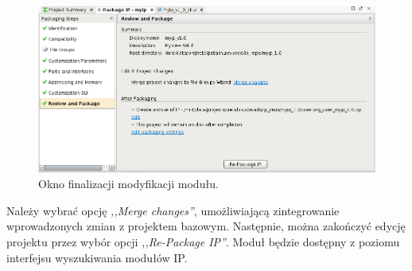 \begin{figure}[ht]
	\centering
	\includegraphics[width=12cm]{img/vivado/axi-dma-review-package.png}
	\caption{Okno finalizacji modyfikacji modułu.}
	\label{fig:axi-dma-review-package}
\end{figure}

Należy wybrać opcję \emph{,,Merge changes''}, umożliwiającą zintegrowanie wprowadzonych zmian z projektem bazowym. Następnie, można zakończyć edycję projektu przez wybór opcji \emph{,,Re-Package IP''}. Moduł będzie dostępny z poziomu interfejsu wyszukiwania modułów IP.

